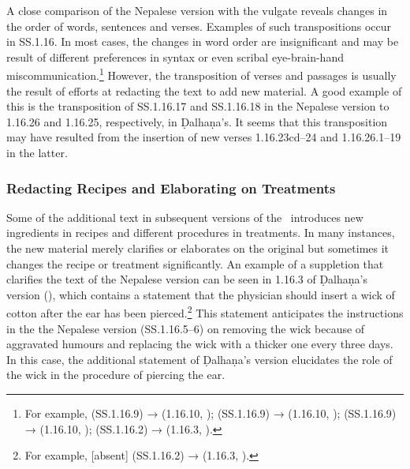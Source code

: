 A close comparison of the Nepalese version with the vulgate reveals changes in the 
order of words, sentences and verses. Examples of such transpositions occur in SS.1.16. In 
most cases, the changes in word order are insignificant and may be result of different 
preferences in syntax or even scribal eye-brain-hand miscommunication.\footnote{For 
example,  (SS.1.16.9) →  (1.16.10, \cite[77]{vulgate}); 
 (SS.1.16.9) →  (1.16.10, 
\cite[77]{vulgate});  (SS.1.16.9) → 
 (1.16.10, \cite[77]{vulgate}); 
(SS.1.16.2) →  (1.16.3, \cite[76]{vulgate}).} However, the transposition of verses and 
passages is usually the result of efforts at redacting the text to add new material. A good 
example of this is the transposition of SS.1.16.17 and SS.1.16.18 in the Nepalese version to 
1.16.26 and 1.16.25, respectively, in Ḍalhaṇa's. It seems that this transposition may have 
resulted from the insertion of new verses 1.16.23cd–24 and 1.16.26.1–19 in the latter.


%
\subsubsection{Redacting Recipes and Elaborating on Treatments}
Some of the additional text in subsequent versions of the \SS\ introduces new ingredients in 
recipes and different procedures in treatments. In many instances, the new material merely 
clarifies or elaborates on the original but sometimes it changes the recipe or treatment 
significantly. An example of a suppletion that clarifies the text of the Nepalese version can be 
seen in 1.16.3 of Ḍalhaṇa's version (\cite[76]{vulgate}), which contains a statement that the 
physician should insert a wick of cotton after the ear has been pierced.\footnote{For 
example, [absent] (SS.1.16.2) →  (1.16.3, \cite[76]{vulgate}).} 
This statement anticipates the instructions in the the Nepalese version (SS.1.16.5–6) on 
removing the wick because of aggravated humours and replacing the wick with a thicker one 
every three days. In this case, the additional statement of Ḍalhaṇa's version elucidates the 
role of the wick in the procedure of piercing the ear. 

